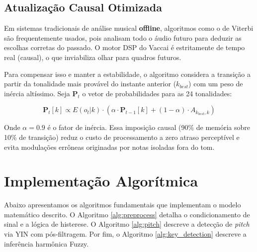 \documentclass[11pt, a4paper]{article}
\theoremstyle{plain}
\theoremstyle{definition}
\begin{document}
\subsection{Atualização Causal Otimizada}

Em sistemas tradicionais de análise musical \textbf{offline}, algoritmos como o de Viterbi são frequentemente usados, pois analisam todo o áudio futuro para deduzir as escolhas corretas do passado. O motor DSP do Vaccai é estritamente de tempo real (causal), o que inviabiliza olhar para quadros futuros.

Para compensar isso e manter a estabilidade, o algoritmo considera a transição a partir da tonalidade mais provável do instante anterior ($k_{best}$) com um peso de inércia altíssimo. Seja $\mathbf{P}_t$ o vetor de probabilidades para as 24 tonalidades:

\begin{equation}
    \mathbf{P}_t[k] \propto E(o_t | k) \cdot \left( \alpha \cdot \mathbf{P}_{t-1}[k] + (1 - \alpha) \cdot A_{k_{best}, k} \right)
\end{equation}

Onde $\alpha = 0.9$ é o fator de inércia. Essa imposição causal (90\% de memória sobre 10\% de transição) reduz o custo de processamento a zero atraso perceptível e evita modulações errôneas originadas por notas isoladas fora do tom.


\clearpage

\appendix
\section{Implementação Algorítmica}

Abaixo apresentamos os algoritmos fundamentais que implementam o modelo matemático descrito. O Algoritmo \ref{alg:preprocess} detalha o condicionamento de sinal e a lógica de histerese. O Algoritmo \ref{alg:pitch} descreve a detecção de \textit{pitch} via YIN com pós-filtragem. Por fim, o Algoritmo \ref{alg:key_detection} descreve a inferência harmônica Fuzzy.
\end{document}
